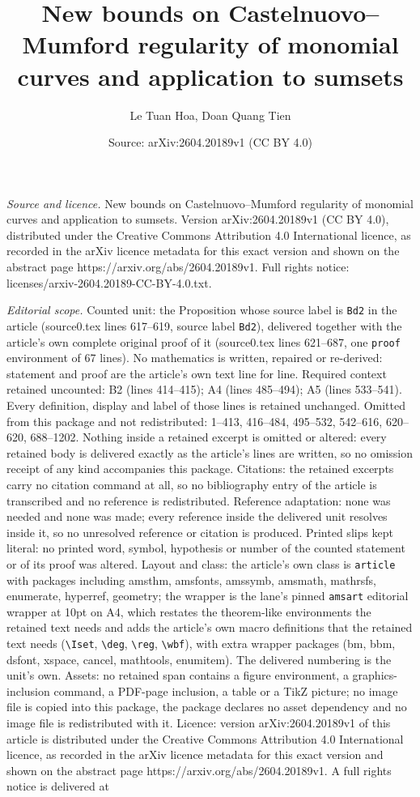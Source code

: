 \documentclass[10pt,a4paper]{amsart}
\title[New bounds on Castelnuovo--Mumford regularity of monomial cu]{New bounds on Castelnuovo--Mumford regularity of monomial curves and application to sumsets}
\author{Le Tuan Hoa, Doan Quang Tien}
\date{Source: arXiv:2604.20189v1 (CC BY 4.0)}
\begin{document}
\maketitle

\noindent\emph{Source and licence.} New bounds on Castelnuovo--Mumford regularity of monomial curves and application to sumsets. Version arXiv:2604.20189v1 (CC BY 4.0), distributed under the Creative Commons Attribution 4.0 International licence, as recorded in the arXiv licence metadata for this exact version and shown on the abstract page https://arxiv.org/abs/2604.20189v1. Full rights notice: licenses/arxiv-2604.20189-CC-BY-4.0.txt.\par\smallskip

\noindent\textit{Editorial scope.} Counted unit: the Proposition whose source label is \texttt{Bd2} in the article (source0.tex lines 617--619, source label \texttt{Bd2}), delivered together with the article's own complete original proof of it (source0.tex lines 621--687, one \texttt{proof} environment of 67 lines). No mathematics is written, repaired or re-derived: statement and proof are the article's own text line for line. Required context retained uncounted: B2 (lines 414--415); A4 (lines 485--494); A5 (lines 533--541). Every definition, display and label of those lines is retained unchanged. Omitted from this package and not redistributed: 1--413, 416--484, 495--532, 542--616, 620--620, 688--1202. Nothing inside a retained excerpt is omitted or altered: every retained body is delivered exactly as the article's lines are written, so no omission receipt of any kind accompanies this package. Citations: the retained excerpts carry no citation command at all, so no bibliography entry of the article is transcribed and no reference is redistributed. Reference adaptation: none was needed and none was made; every reference inside the delivered unit resolves inside it, so no unresolved reference or citation is produced. Printed slips kept literal: no printed word, symbol, hypothesis or number of the counted statement or of its proof was altered. Layout and class: the article's own class is \texttt{article} with packages including amsthm, amsfonts, amssymb, amsmath, mathrsfs, enumerate, hyperref, geometry; the wrapper is the lane's pinned \texttt{amsart} editorial wrapper at 10pt on A4, which restates the theorem-like environments the retained text needs and adds the article's own macro definitions that the retained text needs (\texttt{\textbackslash Iset}, \texttt{\textbackslash deg}, \texttt{\textbackslash reg}, \texttt{\textbackslash wbf}), with extra wrapper packages (bm, bbm, dsfont, xspace, cancel, mathtools, enumitem). The delivered numbering is the unit's own. Assets: no retained span contains a figure environment, a graphics-inclusion command, a PDF-page inclusion, a table or a TikZ picture; no image file is copied into this package, the package declares no asset dependency and no image file is redistributed with it. Licence: version arXiv:2604.20189v1 of this article is distributed under the Creative Commons Attribution 4.0 International licence, as recorded in the arXiv licence metadata for this exact version and shown on the abstract page https://arxiv.org/abs/2604.20189v1. A full rights notice is delivered at 
\end{document}
